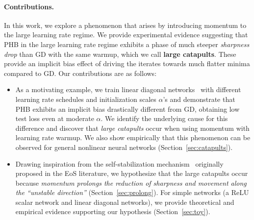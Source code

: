 \paragraph{Contributions.}
In this work, we explore a phenomenon that arises by introducing momentum to the large learning rate regime. We provide experimental evidence suggesting that PHB in the large learning rate regime exhibits a phase of much steeper {\it sharpness drop} than GD with the same warmup, which we call {\bf large catapults}. These provide an implicit bias effect of driving the iterates towards much flatter minima compared to GD. Our contributions are as follows:
\begin{itemize}[leftmargin=10pt]
    \item As a motivating example, we train linear diagonal networks~\citep{woodworth2020kernel,nacson2022stepsize} with different learning rate schedules and initialization scales $\alpha$'s and demonstrate that PHB exhibits an implicit bias drastically different from GD, obtaining low test loss even at moderate $\alpha$. We identify the underlying cause for this difference and discover that \emph{large catapults} occur when using momentum with learning rate warmup. We also show empirically that this phenomenon can be observed for general nonlinear neural networks (Section~\ref{sec:catapults}).
    
    \item Drawing inspiration from the self-stabilization mechanism~\citep{damian2023stabilization} originally proposed in the EoS literature, we hypothesize that the large catapults occur because \emph{momentum prolongs the reduction of sharpness and movement along the ``unstable direction''} (Section~\ref{sec:prolong}).
    For simple networks (a ReLU scalar network and linear diagonal networks), we provide theoretical and empirical evidence supporting our hypothesis (Section~\ref{sec:toy}).
\end{itemize}




